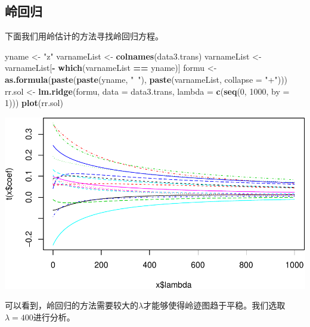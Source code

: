 \documentclass[]{article}
\newenvironment{Shaded}{\begin{snugshade}}{\end{snugshade}}
\newcommand{\KeywordTok}[1]{\textcolor[rgb]{0.13,0.29,0.53}{\textbf{#1}}}
\newcommand{\DataTypeTok}[1]{\textcolor[rgb]{0.13,0.29,0.53}{#1}}
\newcommand{\DecValTok}[1]{\textcolor[rgb]{0.00,0.00,0.81}{#1}}
\newcommand{\StringTok}[1]{\textcolor[rgb]{0.31,0.60,0.02}{#1}}
\newcommand{\OperatorTok}[1]{\textcolor[rgb]{0.81,0.36,0.00}{\textbf{#1}}}
\newcommand{\NormalTok}[1]{#1}
\begin{document}
%
\subsection{岭回归}

下面我们用岭估计的方法寻找岭回归方程。

\begin{Shaded}
\begin{Highlighting}[]
\NormalTok{yname <-}\StringTok{ "z"}
\NormalTok{varnameList <-}\StringTok{ }\KeywordTok{colnames}\NormalTok{(data3.trans)}
\NormalTok{varnameList <-}\StringTok{ }\NormalTok{varnameList[}\OperatorTok{-}\StringTok{ }\KeywordTok{which}\NormalTok{(varnameList }\OperatorTok{==}\StringTok{ }\NormalTok{yname)]}
\NormalTok{formu <-}\StringTok{ }\KeywordTok{as.formula}\NormalTok{(}\KeywordTok{paste}\NormalTok{(}\KeywordTok{paste}\NormalTok{(yname, }\StringTok{"~"}\NormalTok{), }\KeywordTok{paste}\NormalTok{(varnameList, }\DataTypeTok{collapse =} \StringTok{"+"}\NormalTok{)))}
\NormalTok{rr.sol <-}\StringTok{ }\KeywordTok{lm.ridge}\NormalTok{(formu, }\DataTypeTok{data =}\NormalTok{ data3.trans, }
                   \DataTypeTok{lambda =} \KeywordTok{c}\NormalTok{(}\KeywordTok{seq}\NormalTok{(}\DecValTok{0}\NormalTok{, }\DecValTok{1000}\NormalTok{, }\DataTypeTok{by =} \DecValTok{1}\NormalTok{)))}
\KeywordTok{plot}\NormalTok{(rr.sol)}
\end{Highlighting}
\end{Shaded}

\includegraphics{FinalProjectForRegressionAnalysis_files/figure-latex/unnamed-chunk-33-1.pdf}

可以看到，岭回归的方法需要较大的\(\lambda\)才能够使得岭迹图趋于平稳。我们选取\(\lambda = 400\)进行分析。
\end{document}
